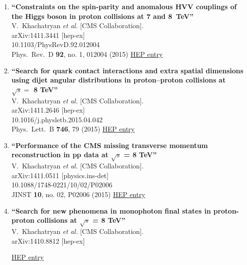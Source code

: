 \documentclass{article}
\begin{document}
\begin{enumerate}
\item%
{\bf ``Constraints on the spin-parity and anomalous HVV couplings of the Higgs boson in proton collisions at 7 and 8 TeV''}
  \\{}V.~Khachatryan {\it et al.} [CMS Collaboration].
  \\{}arXiv:1411.3441 [hep-ex]
    \\{}10.1103/PhysRevD.92.012004
\\{}Phys.\ Rev.\ D {\bf 92}, no. 1, 012004 (2015) %
\href{http://inspirehep.net/record/1327726}{HEP entry}


\item%
{\bf ``Search for quark contact interactions and extra spatial dimensions using dijet angular distributions in proton–proton collisions at $\sqrt s =$ 8 TeV''}
  \\{}V.~Khachatryan {\it et al.} [CMS Collaboration].
  \\{}arXiv:1411.2646 [hep-ex]
    \\{}10.1016/j.physletb.2015.04.042
\\{}Phys.\ Lett.\ B {\bf 746}, 79 (2015) %
\href{http://inspirehep.net/record/1327224}{HEP entry}


\item%
{\bf ``Performance of the CMS missing transverse momentum reconstruction in pp data at $\sqrt{s}$ = 8 TeV''}
  \\{}V.~Khachatryan {\it et al.} [CMS Collaboration].
  \\{}arXiv:1411.0511 [physics.ins-det]
    \\{}10.1088/1748-0221/10/02/P02006
\\{}JINST {\bf 10}, no. 02, P02006 (2015) %
\href{http://inspirehep.net/record/1325798}{HEP entry}


\item%
{\bf ``Search for new phenomena in monophoton final states in proton-proton collisions at $\sqrt{s}$ = 8 TeV''}
  \\{}V.~Khachatryan {\it et al.} [CMS Collaboration].
  \\{}arXiv:1410.8812 [hep-ex]
  
\href{http://inspirehep.net/record/1325549}{HEP entry}



\end{enumerate}
\end{document}
